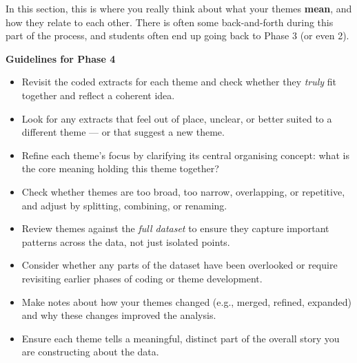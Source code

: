 \documentclass[
  english,
  letterpaper,
  DIV=11,
  numbers=noendperiod]{scrreprt}
\providecommand{\tightlist}{%
  \setlength{\itemsep}{0pt}\setlength{\parskip}{0pt}}
\begin{document}
In this section, this is where you really think about what your themes
\textbf{mean}, and how they relate to each other. There is often some
back-and-forth during this part of the process, and students often end
up going back to Phase 3 (or even 2).

\textbf{Guidelines for Phase 4}

\begin{itemize}
\tightlist
\item
  Revisit the coded extracts for each theme and check whether they
  \emph{truly} fit together and reflect a coherent idea.
\item
  Look for any extracts that feel out of place, unclear, or better
  suited to a different theme --- or that suggest a new theme.
\item
  Refine each theme's focus by clarifying its central organising
  concept: what is the core meaning holding this theme together?
\item
  Check whether themes are too broad, too narrow, overlapping, or
  repetitive, and adjust by splitting, combining, or renaming.
\item
  Review themes against the \emph{full dataset} to ensure they capture
  important patterns across the data, not just isolated points.
\item
  Consider whether any parts of the dataset have been overlooked or
  require revisiting earlier phases of coding or theme development.
\item
  Make notes about how your themes changed (e.g., merged, refined,
  expanded) and why these changes improved the analysis.
\item
  Ensure each theme tells a meaningful, distinct part of the overall
  story you are constructing about the data.
\end{itemize}
\end{document}
